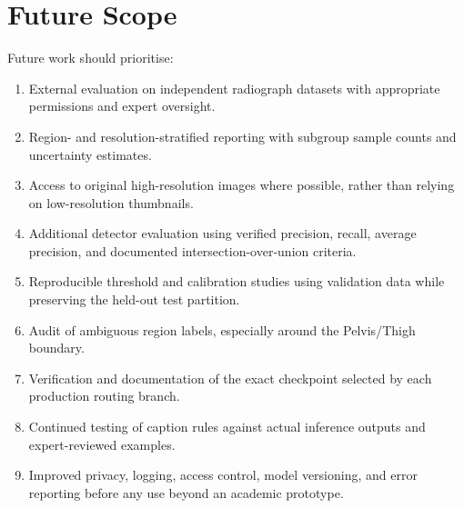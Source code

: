 \documentclass{article}
\begin{document}
\section{Future Scope}
Future work should prioritise:
\begin{enumerate}[noitemsep]
    \item External evaluation on independent radiograph datasets with appropriate permissions and expert oversight.
    \item Region- and resolution-stratified reporting with subgroup sample counts and uncertainty estimates.
    \item Access to original high-resolution images where possible, rather than relying on low-resolution thumbnails.
    \item Additional detector evaluation using verified precision, recall, average precision, and documented intersection-over-union criteria.
    \item Reproducible threshold and calibration studies using validation data while preserving the held-out test partition.
    \item Audit of ambiguous region labels, especially around the Pelvis/Thigh boundary.
    \item Verification and documentation of the exact checkpoint selected by each production routing branch.
    \item Continued testing of caption rules against actual inference outputs and expert-reviewed examples.
    \item Improved privacy, logging, access control, model versioning, and error reporting before any use beyond an academic prototype.
\end{enumerate}
\end{document}
